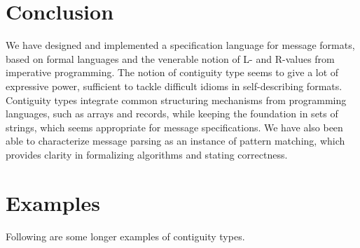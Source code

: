 \documentclass[svgnames]{llncs}
\begin{document}
\section{Conclusion}

We have designed and implemented a specification language for message
formats, based on formal languages and the venerable notion of L- and
R-values from imperative programming. The notion of contiguity type
seems to give a lot of expressive power, sufficient to tackle
difficult idioms in self-describing formats. Contiguity types
integrate common structuring mechanisms from programming languages,
such as arrays and records, while keeping the foundation in sets of
strings, which seems appropriate for message specifications. We have
also been able to characterize message parsing as an instance of
pattern matching, which provides clarity in formalizing algorithms and
stating correctness.

\appendix

\section{Examples}

Following are some longer examples of contiguity types.
\end{document}
